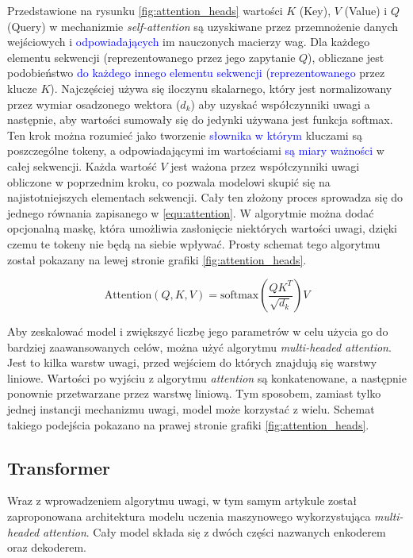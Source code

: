 \documentclass[data-science]{agh-wi} %
\begin{document}
Przedstawione na rysunku \ref*{fig:attention_heads} wartości $K$ (Key), $V$ (Value) i $Q$ (Query) w mechanizmie \textit{self-attention} są uzyskiwane przez przemnożenie danych wejściowych i \textcolor{blue}{odpowiadających} im nauczonych macierzy wag. Dla każdego elementu sekwencji (reprezentowanego przez jego zapytanie $Q$), obliczane jest podobieństwo \textcolor{blue}{do każdego innego elementu sekwencji} (\textcolor{blue}{reprezentowanego} przez klucze $K$). Najczęściej używa się iloczynu skalarnego, który jest normalizowany przez wymiar osadzonego wektora ($d_k$) aby uzyskać współczynniki uwagi a następnie, aby wartości sumowały się do jedynki używana jest funkcja softmax. Ten krok można rozumieć jako tworzenie \textcolor{blue}{słownika w którym} kluczami są poszczególne tokeny, a odpowiadającymi im wartościami \textcolor{blue}{są miary ważności} w całej sekwencji. Każda wartość $V$ jest ważona przez współczynniki uwagi obliczone w poprzednim kroku, co pozwala modelowi skupić się na najistotniejszych elementach sekwencji. Cały ten złożony proces sprowadza się do jednego równania zapisanego w \ref*{equ:attention}. W algorytmie można dodać opcjonalną maskę, która umożliwia zasłonięcie niektórych wartości uwagi, dzięki czemu te tokeny nie będą na siebie wpływać. Prosty schemat tego algorytmu został pokazany na lewej stronie grafiki \ref*{fig:attention_heads}.

\begin{equation}
    \text{Attention}(Q, K, V) = \text{softmax}\left(\dfrac{QK^T}{\sqrt{d_k}}\right)V
    \label{equ:attention}
\end{equation}

Aby zeskalować model i zwiększyć liczbę jego parametrów w celu użycia go do bardziej zaawansowanych celów, można użyć algorytmu \textit{multi-headed attention}. Jest to kilka warstw uwagi, przed wejściem do których znajdują się warstwy liniowe. Wartości po wyjściu z algorytmu \textit{attention} są konkatenowane, a następnie ponownie przetwarzane przez warstwę liniową. Tym sposobem, zamiast tylko jednej instancji mechanizmu uwagi, model może korzystać z wielu. Schemat takiego podejścia pokazano na prawej stronie grafiki \ref*{fig:attention_heads}.

\subsection{Transformer}
Wraz z wprowadzeniem algorytmu uwagi, w tym samym artykule został zaproponowana architektura modelu uczenia maszynowego wykorzystująca \textit{multi-headed attention}. Cały model składa się z dwóch części nazwanych enkoderem oraz dekoderem.
\end{document}
